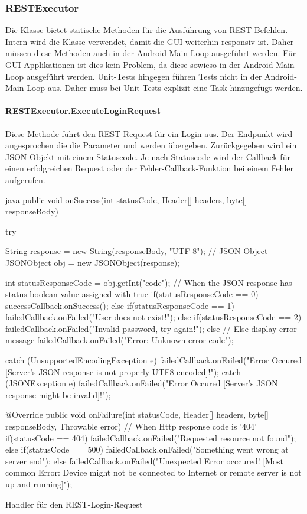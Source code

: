 \subsubsection{RESTExecutor}
Die Klasse  bietet statische Methoden für die Ausführung von REST-Befehlen. Intern wird die Klasse  verwendet, damit die GUI weiterhin responsiv ist. Daher müssen diese Methoden auch in der Android-Main-Loop ausgeführt werden. Für GUI-Applikationen ist dies kein Problem, da diese sowieso in der Android-Main-Loop ausgeführt werden. Unit-Tests hingegen führen Tests nicht in der Android-Main-Loop aus. Daher muss bei Unit-Tests explizit eine Task hinzugefügt werden.


\paragraph{RESTExecutor.ExecuteLoginRequest}
Diese Methode führt den REST-Request für ein Login aus. Der Endpunkt  wird angesprochen die die Parameter  und  werden übergeben. Zurückgegeben wird ein JSON-Objekt mit einem Statuscode. Je nach Statuscode wird der Callback für einen erfolgreichen Request oder der Fehler-Callback-Funktion bei einem Fehler aufgerufen.

\begin{listing}
\begin{code}{java}
public void onSuccess(int statusCode, Header[] headers, byte[] responseBody) {
	try {
		String response = new String(responseBody, "UTF-8");
		// JSON Object
		JSONObject obj = new JSONObject(response);
		
		int statusResponseCode = obj.getInt("code");
		// When the JSON response has status boolean value assigned with true
		if(statusResponseCode == 0) {
			successCallback.onSuccess();
		} else if(statusResponseCode == 1) {
			failedCallback.onFailed("User does not exist!");
		} else if(statusResponseCode == 2) {
			failedCallback.onFailed("Invalid password, try again!");
		} else { // Else display error message
		failedCallback.onFailed("Error: Unknown error code");
		}
	} catch (UnsupportedEncodingException e) {
		failedCallback.onFailed("Error Occured [Server's JSON response is not properly UTF8 encoded]!");
	} catch (JSONException e) {
		failedCallback.onFailed("Error Occured [Server's JSON response might be invalid]!");
	}
}

@Override
public void onFailure(int statusCode, Header[] headers, byte[] responseBody, Throwable error) {
	// When Http response code is '404'
	if(statusCode == 404){
		failedCallback.onFailed("Requested resource not found");
	} else if(statusCode == 500){
	failedCallback.onFailed("Something went wrong at server end");
	} else {
		failedCallback.onFailed("Unexpected Error occcured! [Most common Error: Device might not be 	connected to Internet or remote server is not up and running]");
	}
}

\end{code}
\caption{Handler für den REST-Login-Request}
\end{listing}

